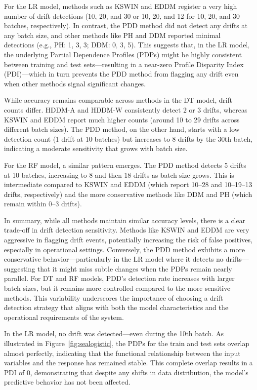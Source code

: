 \documentclass[pdflatex,sn-mathphys-ay]{sn-jnl}%
\theoremstyle{thmstyleone}%
\theoremstyle{thmstyletwo}%
\theoremstyle{thmstylethree}%
\begin{document}
For the LR model, methods such as KSWIN and EDDM register a very high number of drift detections (10, 20, and 30 or 10, 20, and 12 for 10, 20, and 30 batches, respectively). In contrast, the PDD method did not detect any drifts at any batch size, and other methods like PH and DDM reported minimal detections (e.g., PH: 1, 3, 3; DDM: 0, 3, 5). This suggests that, in the LR model, the underlying Partial Dependence Profiles (PDPs) might be highly consistent between training and test sets—resulting in a near-zero Profile Disparity Index (PDI)—which in turn prevents the PDD method from flagging any drift even when other methods signal significant changes.

While accuracy remains comparable across methods in the DT model, drift counts differ. HDDM-A and HDDM-W consistently detect 2 or 3 drifts, whereas KSWIN and EDDM report much higher counts (around 10 to 29 drifts across different batch sizes). The PDD method, on the other hand, starts with a low detection count (1 drift at 10 batches) but increases to 8 drifts by the 30th batch, indicating a moderate sensitivity that grows with batch size.

For the RF model, a similar pattern emerges. The PDD method detects 5 drifts at 10 batches, increasing to 8 and then 18 drifts as batch size grows. This is intermediate compared to KSWIN and EDDM (which report 10–28 and 10–19–13 drifts, respectively) and the more conservative methods like DDM and PH (which remain within 0–3 drifts).

In summary, while all methods maintain similar accuracy levels, there is a clear trade-off in drift detection sensitivity. Methods like KSWIN and EDDM are very aggressive in flagging drift events, potentially increasing the risk of false positives, especially in operational settings. Conversely, the PDD method exhibits a more conservative behavior—particularly in the LR model where it detects no drifts—suggesting that it might miss subtle changes when the PDPs remain nearly parallel. For DT and RF models, PDD’s detection rate increases with larger batch sizes, but it remains more controlled compared to the more sensitive methods. This variability underscores the importance of choosing a drift detection strategy that aligns with both the model characteristics and the operational requirements of the system.

In the LR model, no drift was detected—even during the 10th batch. As illustrated in Figure~\ref{fig:sealogistic}, the PDPs for the train and test sets overlap almost perfectly, indicating that the functional relationship between the input variables and the response has remained stable. This complete overlap results in a PDI of 0, demonstrating that despite any shifts in data distribution, the model’s predictive behavior has not been affected.
\end{document}
